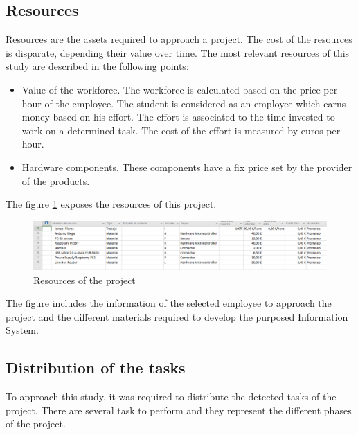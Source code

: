 \subsection{Resources}

Resources are the assets required to approach a project. The cost of the resources is disparate, depending their value over time. The most relevant resources of this study are described in the following points:

\begin{itemize}

\item Value of the workforce. The workforce is calculated based on the price per hour of the employee. The student is considered as an employee which earns money based on his effort. The effort is associated to the time invested to work on a determined task. The cost of the effort is measured by euros per hour.
\item Hardware components. These components have a fix price set by the provider of the products.

\end{itemize}

The figure \ref{Resources of the project} exposes the resources of this project.

\begin{figure}[H]
\begin{centering}
\includegraphics[scale=0.5]{IMGS/resources_project.PNG}
\caption{Resources of the project \label{Resources of the project}}
\end{centering}
\end{figure}

The figure includes the information of the selected employee to approach the project and the different materials required to develop the purposed Information System.

\subsection{Distribution of the tasks}

To approach this study, it was required to distribute the detected tasks of the project. There are several task to perform and they represent the different phases of the project.\\

